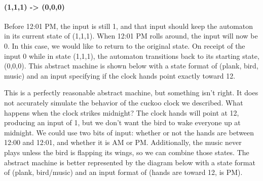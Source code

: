 \paragraph{(1,1,1) -> (0,0,0)} Before 12:01 PM, the input is still 1, and that input should keep the automaton in its current state of (1,1,1). When 12:01 PM rolls around, the input will now be 0. In this case, we would like to return to the original state. On receipt of the input 0 while in state (1,1,1), the automaton transitions back to its starting state, (0,0,0). This abstract machine is shown below with a state format of (plank, bird, music) and an input specifying if the clock hands point exactly toward 12.

\vspace{4mm}
\begin{center}
\end{center}
\vspace{5mm}

This is a perfectly reasonable abstract machine, but something isn't right. It does not accurately simulate the behavior of the cuckoo clock we described. What happens when the clock strikes midnight? The clock hands will point at 12, producing an input of 1, but we don't want the bird to wake everyone up at midnight. We could use two bits of input: whether or not the hands are between 12:00 and 12:01, and whether it is AM or PM. Additionally, the music never plays unless the bird is flapping its wings, so we can combine those states. The abstract machine is better represented by the diagram below with a state format of (plank, bird/music) and an input format of (hands are toward 12, is PM).

